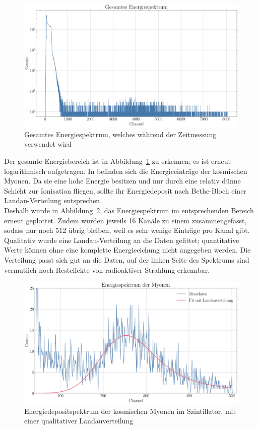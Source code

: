 \documentclass[12pt,a4paper,ngerman]{report}
\begin{document}
	\begin{figure}[ht]
		\centering
		\includegraphics[width=\textwidth]{Bilder/gesamterEnBereich.pdf}		
		\caption[Energiespektrum]{Gesamtes Energiespektrum, welches während der Zeitmessung verwendet wird}
		\label{img:gesamterEnBereich}
	\end{figure}
	Der gesamte Energiebereich ist in Abbildung~\ref{img:gesamterEnBereich} zu erkennen; es ist erneut logarithmisch aufgetragen. In \cite{Nakamura} befinden  sich die Energieeinträge der kosmischen Myonen. Da sie eine hohe Energie besitzen und nur durch eine relativ dünne Schicht zur Ionisation fliegen, sollte ihr Energiedeposit nach Bethe-Bloch einer Landau-Verteilung entsprechen.\\ %
	Deshalb wurde in Abbildung~\ref{img:MyonenLandau}, das Energiespektrum im entsprechenden Bereich erneut geplottet. Zudem wurden jeweils 16 Kanäle zu einem zusammengefasst, sodass nur noch 512 übrig bleiben, weil es sehr wenige Einträge pro Kanal gibt. Qualitativ wurde eine Landau-Verteilung an die Daten gefittet; quantitative Werte können ohne eine komplette Energieeichung nicht angegeben werden. Die Verteilung passt sich gut an die Daten, auf der linken Seite des Spektrums sind vermutlich noch Resteffekte von radioaktiver Strahlung erkennbar. 
	\begin{figure}[ht]
		\centering
		\includegraphics[width=\textwidth]{Bilder/MyonenLandau.pdf}		
		\caption[Energiedepositspektrum]{Energiedepositspektrum der kosmischen Myonen im Szintillator, mit einer qualitativer Landauverteilung}
		\label{img:MyonenLandau}
	\end{figure}
\end{document}
